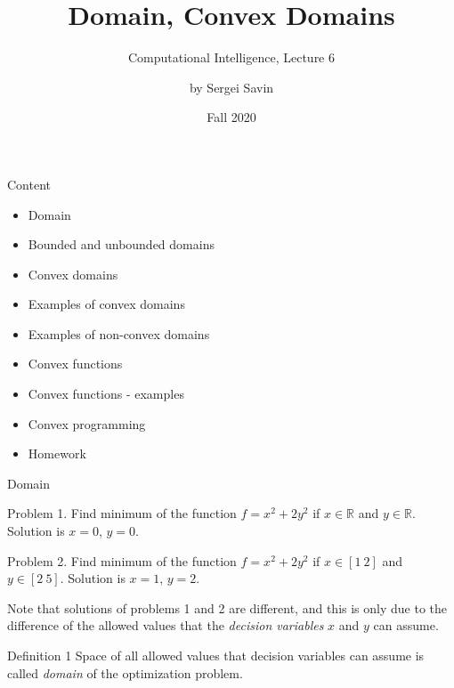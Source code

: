 \documentclass{beamer}
\title{Domain, Convex Domains}
\subtitle{Computational Intelligence, Lecture 6}
\author{by Sergei Savin}
\date{Fall 2020}
\begin{document}
\maketitle


\begin{frame}{Content}

\begin{itemize}
\item Domain
\item Bounded and unbounded domains
\item Convex domains
\item Examples of convex domains
\item Examples of non-convex domains
\item Convex functions
\item Convex functions - examples
\item Convex programming
\item Homework
\end{itemize}

\end{frame}



\begin{frame}{Domain}
\begin{flushleft}

Problem 1. Find minimum of the function $f = x^2 + 2y^2$ if $x \in \mathbb{R}$ and $y \in \mathbb{R}$. Solution is $x = 0$, $y = 0$.

\bigskip

Problem 2. Find minimum of the function $f = x^2 + 2y^2$ if $x \in [1 \ 2]$ and $y \in [2 \ 5]$. Solution is $x = 1$, $y = 2$.

\bigskip

Note that solutions of problems 1 and 2 are different, and this is only due to the difference of the allowed values that the \emph{decision variables} $x$ and $y$ can assume.

\begin{block}{Definition 1}
Space of all allowed values that decision variables can assume is called \emph{domain} of the optimization problem.
\end{block}
 
\end{flushleft}
\end{frame}
\end{document}
